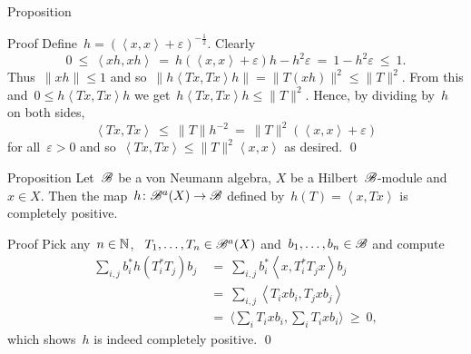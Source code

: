 \documentclass[b]{subfiles}
\begin{document}
\begin{parsec}
\begin{point}{Proposition}
\begin{point}{Proof}
Define~$h = (\left<x,x\right> + \varepsilon)^{-\frac{1}{2}}$.
Clearly
\begin{equation*}
0 \ \leq\  \left<xh,xh\right>
    \ =\  h (\left<x,x\right> + \varepsilon)h - h^2 \varepsilon
    \ =\  1 - h^2 \varepsilon \ \leq\  1.
\end{equation*}
Thus~$\|xh\| \leq 1$
and so~$\|h\left<Tx, Tx\right>h\| = \|T(xh)\|^2 \leq \|T\|^2$.
From this and~$0 \leq h\left<Tx,Tx\right>h$
we get~$h\left<Tx,Tx\right>h \leq \|T\|^2$. Hence, by dividing by~$h$
    on both sides,
\begin{equation*}
\left<Tx,Tx\right> \ \leq \ \|T\| h^{-2}\  =
    \  \|T\|^2(\left<x,x\right> + \varepsilon)
\end{equation*}
for all~$\varepsilon > 0$
and so~$\left<Tx,Tx\right> \leq \|T\|^2 \left<x,x\right>$ as desired. \qed
\end{point}
\end{point}
\end{parsec}

\begin{parsec}%
\begin{point}{Proposition}%
Let~$\mathscr{B}$ be a von Neumann algebra,
    $X$ be a Hilbert~$\mathscr{B}$-module
    and~$x \in X$.
Then the map~$h\colon \mathscr{B}^a(X )\to \mathscr{B}$
defined by~$h(T) = \left<x,Tx\right>$
is completely positive.
\begin{point}{Proof}%
Pick any~$n \in \mathbb{N}$, ~$T_1, \ldots, T_n \in \mathscr{B}^a(X)$
    and~$b_1, \ldots, b_n \in \mathscr{B}$
    and compute
\begin{align*}
\sum_{i,j} b_i^* h(T_i^*T_j)b_j
&\ =\ \sum_{i,j} b_i^* \left<x,T_i^*T_j x\right> b_j\\
&\ =\ \sum_{i,j} \left<T_i x b_i,T_j x b_j\right>  \\
&\ =\ \bigl\langle\sum_i T_i x b_i, \sum_i T_i x b_i\bigr\rangle \ \geq\  0,
\end{align*}
which shows~$h$ is indeed completely positive. \qed
\end{point}
\end{point}
\end{parsec}
\end{document}
